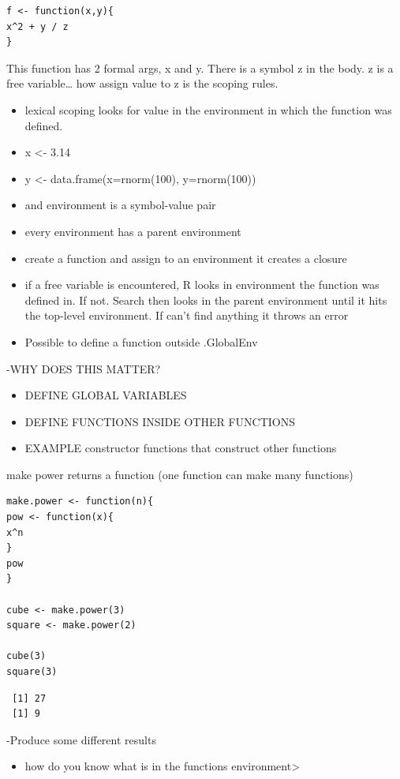 \documentclass[11pt]{article}
\begin{document}
\begin{verbatim}
f <- function(x,y){
x^2 + y / z
}
\end{verbatim}


This function has 2 formal args, x and y. There is a symbol z in the
body. z is a free variable\ldots{} how assign value to z is the scoping
rules.

\begin{itemize}
\item lexical scoping looks for value in the environment in which the
  function was defined.
\item x <- 3.14
\item y <- data.frame(x=rnorm(100), y=rnorm(100))
\item and environment is a symbol-value pair
\item every environment has a parent environment
\item create a function and assign to an environment it creates a closure
\item if a free variable is encountered, R looks in environment the
  function was defined in. If not. Search then looks in the parent
  environment until it hits the top-level environment. If can't find
  anything it throws an error
\item Possible to define a function outside .GlobalEnv
\end{itemize}
-WHY DOES THIS MATTER?
\begin{itemize}
\item DEFINE GLOBAL VARIABLES
\item DEFINE FUNCTIONS INSIDE OTHER FUNCTIONS
\item EXAMPLE constructor functions that construct other functions
\end{itemize}
make power returns a function (one function can make many functions)

\begin{verbatim}
make.power <- function(n){
pow <- function(x){
x^n
}
pow
}

cube <- make.power(3)
square <- make.power(2)

cube(3)
square(3)
\end{verbatim}

\begin{verbatim}
 [1] 27
 [1] 9
\end{verbatim}

-Produce some different results

\begin{itemize}
\item how do you know what is in the functions environment>
\end{itemize}
\end{document}

